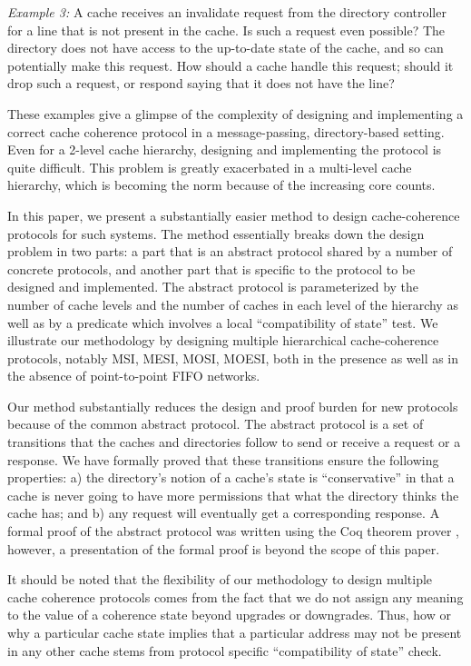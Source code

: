 \emph{Example 3:} A cache receives an invalidate request from the directory
controller for a line that is not present in the cache. Is such a request even
possible? The directory does not have access to the up-to-date state of the
cache, and so can potentially make this request. How should a cache handle this
request; should it drop such a request, or respond saying that it does not have
the line?

These examples give a glimpse of the complexity of designing and implementing a
correct cache coherence protocol in a message-passing, directory-based setting.
Even for a 2-level cache hierarchy, designing and implementing the protocol is
quite difficult. This problem is greatly exacerbated in a multi-level cache
hierarchy, which is becoming the norm because of the increasing core counts. 

In this paper, we present a substantially easier method to design
cache-coherence protocols for such systems. The method essentially breaks down
the design problem in two parts: a part that is an abstract protocol shared by
a number of concrete protocols, and another part that is specific to the
protocol to be designed and implemented. The abstract protocol is parameterized
by the number of cache levels and the number of caches in each level of the
hierarchy as well as by a predicate which involves a local ``compatibility of
state'' test. We illustrate our methodology by designing multiple
hierarchical cache-coherence protocols, notably MSI, MESI, MOSI, MOESI, both in
the presence as well as in the absence of point-to-point FIFO networks.

Our method substantially reduces the design and proof burden for new protocols
because of the common abstract protocol. The abstract protocol is a set of
transitions that the caches and directories follow to send or receive a request
or a response. We have formally proved that these transitions ensure the
following properties: a) the directory's notion of a cache's state is
``conservative'' in that a cache is never going to have more permissions that
what the directory thinks the cache has; and b) any request will eventually get
a corresponding response. A formal proof of the abstract protocol was written
using the Coq theorem prover \cite{}, however, a presentation of the formal
proof is beyond the scope of this paper.

It should be noted that the flexibility of our methodology to design multiple
cache coherence protocols comes from the fact that we do not assign any meaning
to the value of a coherence state beyond upgrades or downgrades. Thus, how or
why a particular cache state implies that a particular address may not be
present in any other cache stems from protocol specific ``compatibility of
state'' check. 

